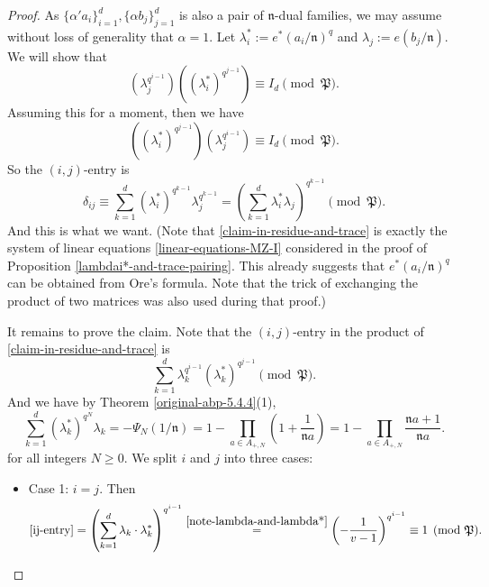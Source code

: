 \documentclass[11pt]{amsart}
\theoremstyle{plain}
\theoremstyle{definition}
\theoremstyle{remark}
\numberwithin{equation}{section}
\newcommand{\nfk}{\mathfrak{n}}
\newcommand{\Pfk}{\mathfrak{P}}
\begin{document}
	\begin{proof}
		As $\{\alpha' a_i\}_{i=1}^d, \{\alpha b_j\}_{j=1}^d$ is also a pair of $\nfk$-dual families, we may assume without loss of generality that $\alpha = 1$.
		Let $\lambda_i^* := e^*(a_i/\nfk)^q$ and $\lambda_j := e(b_j/\nfk)$. We will show that
		\begin{equation}    \label{claim-in-residue-and-trace}
			\left( \lambda_j^{q^{i-1}} \right)
			\left( (\lambda_i^*)^{q^{j-1}} \right)
			\equiv I_d  \pmod{\Pfk}.
		\end{equation}
		Assuming this for a moment, then we have
		$$
		\left( (\lambda_i^*)^{q^{j-1}} \right)
		\left( \lambda_j^{q^{i-1}} \right)
		\equiv I_d  \pmod{\Pfk}.
		$$
		So the $(i,j)$-entry is
		$$
		\delta_{ij}
		\equiv \sum_{k=1}^d (\lambda_i^*)^{q^{k-1}} \lambda_j^{q^{k-1}}
		= \left( \sum_{k=1}^d \lambda_i^* \lambda_j \right)^{q^{k-1}}
		\pmod{\Pfk}.
		$$
		And this is what we want.
		(Note that \eqref{claim-in-residue-and-trace} is exactly the system of linear equations \eqref{linear-equations-MZ-I} considered in the proof of Proposition \ref{lambdai*-and-trace-pairing}.
		This already suggests that $e^*(a_i/\nfk)^q$ can be obtained from Ore's formula.
		Note that the trick of exchanging the product of two matrices was also used during that proof.)
		
		It remains to prove the claim.
		Note that the $(i,j)$-entry in the product of \eqref{claim-in-residue-and-trace} is
		\begin{equation}    \label{ij-entry}
			\sum_{k=1}^d \lambda_k^{q^{i-1}} (\lambda_k^*)^{q^{j-1}}  \pmod{\Pfk}.
		\end{equation}
		And we have by Theorem \ref{original-abp-5.4.4}(1),
		\begin{equation}     \label{note-lambda-and-lambda*}
			\sum_{k=1}^d (\lambda_k^*)^{q^N} \lambda_k
			= -\Psi_N(1/\nfk)
			= 1 - \prod_{a\in A_{+,N}} \left(1+\frac{1}{\nfk a}\right)
			= 1 - \prod_{a\in A_{+,N}} \frac{\nfk a+1}{\nfk a}.
		\end{equation}
		for all integers $N \geq 0$.
		We split $i$ and $j$ into three cases:
		
		\begin{itemize}
			\item Case 1: $i=j$.
			Then
			$$
			\eqref{ij-entry}
			= \left( \sum_{k=1}^d \lambda_k \cdot 	\lambda_k^* \right)^{q^{i-1}}       
			\overset{\eqref{note-lambda-and-lambda*}}{=} \left( -\frac{1}{v-1} \right)^{q^{i-1}}    
			\equiv 1 \pmod{\Pfk}.
			$$
			

\end{itemize}
\end{proof}
\end{document}
